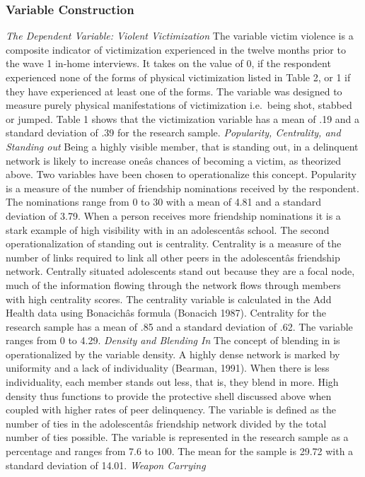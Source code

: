 \documentclass[]{article}
\begin{document}
\subsubsection{Variable Construction}\label{variable-construction}

\emph{The Dependent Variable: Violent Victimization} The variable victim
violence is a composite indicator of victimization experienced in the
twelve months prior to the wave 1 in-home interviews. It takes on the
value of 0, if the respondent experienced none of the forms of physical
victimization listed in Table 2, or 1 if they have experienced at least
one of the forms. The variable was designed to measure purely physical
manifestations of victimization i.e.~being shot, stabbed or jumped.
Table 1 shows that the victimization variable has a mean of .19 and a
standard deviation of .39 for the research sample. \emph{Popularity,
Centrality, and Standing out} Being a highly visible member, that is
standing out, in a delinquent network is likely to increase oneâs
chances of becoming a victim, as theorized above. Two variables have
been chosen to operationalize this concept. Popularity is a measure of
the number of friendship nominations received by the respondent. The
nominations range from 0 to 30 with a mean of 4.81 and a standard
deviation of 3.79. When a person receives more friendship nominations it
is a stark example of high visibility with in an adolescentâs school.
The second operationalization of standing out is centrality. Centrality
is a measure of the number of links required to link all other peers in
the adolescentâs friendship network. Centrally situated adolescents
stand out because they are a focal node, much of the information flowing
through the network flows through members with high centrality scores.
The centrality variable is calculated in the Add Health data using
Bonacichâs formula (Bonacich 1987). Centrality for the research sample
has a mean of .85 and a standard deviation of .62. The variable ranges
from 0 to 4.29. \emph{Density and Blending In} The concept of blending
in is operationalized by the variable density. A highly dense network is
marked by uniformity and a lack of individuality (Bearman, 1991). When
there is less individuality, each member stands out less, that is, they
blend in more. High density thus functions to provide the protective
shell discussed above when coupled with higher rates of peer
delinquency. The variable is defined as the number of ties in the
adolescentâs friendship network divided by the total number of ties
possible. The variable is represented in the research sample as a
percentage and ranges from 7.6 to 100. The mean for the sample is 29.72
with a standard deviation of 14.01. \emph{Weapon Carrying}
\end{document}
